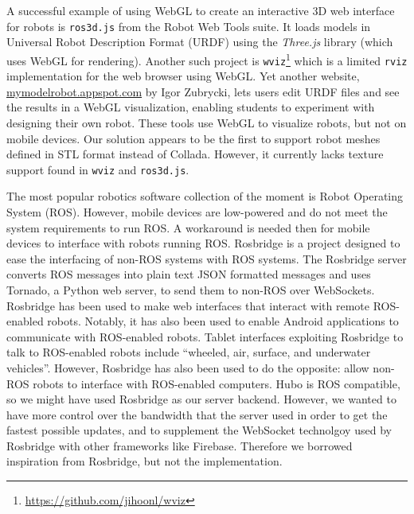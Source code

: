 \documentclass[letterpaper, 10 pt, conference]{ieee/ieeeconf}  %
\begin{document}
A successful example of using WebGL to create an interactive 3D web interface for robots is \texttt{ros3d.js} from the Robot Web Tools suite.
It loads models in Universal Robot Description Format (URDF) using the \textit{Three.js} library (which uses WebGL for rendering). \cite{alexander2012robot}
Another such project is \texttt{wviz}\footnote{\url{https://github.com/jihoonl/wviz}} which is a limited \texttt{rviz} implementation for the web browser using WebGL.
Yet another website, \url{mymodelrobot.appspot.com} by Igor Zubrycki, lets users edit URDF files and see the results in a WebGL visualization, enabling students to experiment with designing their own robot.
These tools use WebGL to visualize robots, but not on mobile devices.
Our solution appears to be the first to support robot meshes defined in STL format instead of Collada.
However, it currently lacks texture support found in \texttt{wviz} and \texttt{ros3d.js}.

The most popular robotics software collection of the moment is Robot Operating System (ROS). \cite{quigley2009ros}
However, mobile devices are low-powered and do not meet the system requirements to run ROS.
A workaround is needed then for mobile devices to interface with robots running ROS.
Rosbridge is a project designed to ease the interfacing of non-ROS systems with ROS systems. \cite{crick2011rosbridge}
The Rosbridge server converts ROS messages into plain text JSON formatted messages and uses Tornado, a Python web server, to send them to non-ROS over WebSockets.
Rosbridge has been used to make web interfaces that interact with remote ROS-enabled robots. \cite{pitzer2012pr2}
Notably, it has also been used to enable Android applications to communicate with ROS-enabled robots.
Tablet interfaces exploiting Rosbridge to talk to ROS-enabled robots include ``wheeled, air, surface, and underwater vehicles''.  \cite{speers2013diver}
However, Rosbridge has also been used to do the opposite: allow non-ROS robots to interface with ROS-enabled computers. \cite{dallaroslink} \cite{aznar2014ros}
Hubo is ROS compatible, so we might have used Rosbridge as our server backend.
However, we wanted to have more control over the bandwidth that the server used in order to get the fastest possible updates, and to supplement the WebSocket technolgoy used by Rosbridge with other frameworks like Firebase.
Therefore we borrowed inspiration from Rosbridge, but not the implementation.

\end{document}
